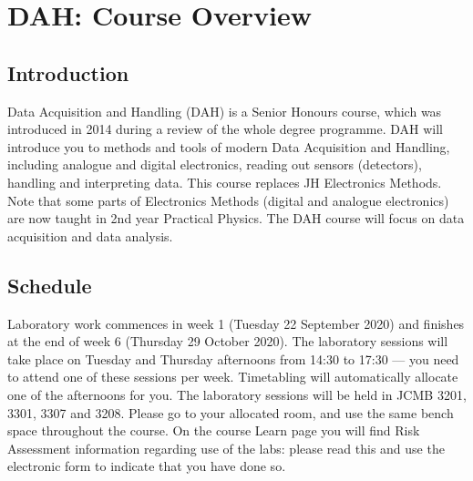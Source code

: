\chapter{DAH: Course Overview}
\label{sec:overview}

\section{Introduction}

Data Acquisition and Handling (DAH) is a Senior Honours course, which was introduced in 2014 during a review of the whole degree programme.
DAH will introduce you to methods and tools of modern Data Acquisition and Handling, including analogue and digital electronics, reading out sensors (detectors), handling and interpreting data.
This course replaces JH Electronics Methods.
Note that some parts of Electronics Methods (digital and analogue electronics) are now taught in 2nd year Practical Physics.
The DAH course will focus on data acquisition and data analysis.

\section{Schedule}

Laboratory work commences in week 1 (Tuesday 22 September 2020)
and finishes at the end of week 6 (Thursday 29 October 2020).
The laboratory sessions will take place on Tuesday and Thursday afternoons from 14:30 to 17:30 --- you need to attend one of these sessions per week.
Timetabling will automatically allocate one of the afternoons for you.
The laboratory sessions will be held in JCMB 3201, 3301, 3307 and 3208.
Please go to your allocated room, and use the same bench space throughout the course.
On the course Learn page you will find Risk Assessment information regarding use of the labs: please read this and use the electronic form to indicate that you have done so.


